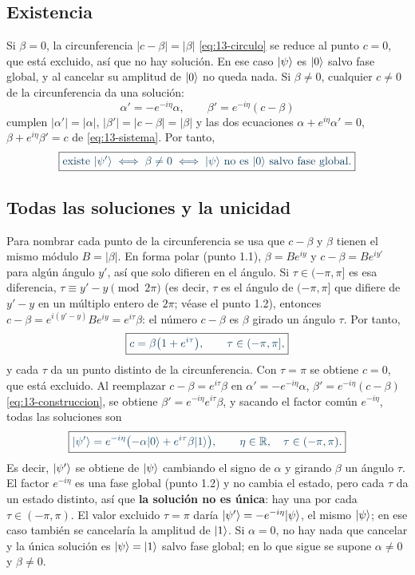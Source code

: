 \subsection*{Existencia}

Si $\beta=0$, la circunferencia $|c-\beta|=|\beta|$ \eqref{eq:13-circulo} se reduce al punto
$c=0$, que está excluido, así que no hay solución. En ese caso $\lvert \psi\rangle$ es $\lvert 0\rangle$ salvo fase
global, y al cancelar su amplitud de $\lvert 0\rangle$ no queda nada. Si $\beta\neq0$, cualquier $c\neq0$
de la circunferencia da una solución:
\begin{equation}\label{eq:13-construccion}
  \alpha'=-e^{-i\eta}\alpha,\qquad \beta'=e^{-i\eta}(c-\beta)
\end{equation}
cumplen $|\alpha'|=|\alpha|$, $|\beta'|=|c-\beta|=|\beta|$ y las dos ecuaciones
$\alpha+e^{i\eta}\alpha'=0$, $\beta+e^{i\eta}\beta'=c$ de \eqref{eq:13-sistema}. Por tanto,
\[
  \destacado{\text{existe }\ket{\psi'}\iff \beta\neq0\iff \ket\psi\text{ no es }\ket0
  \text{ salvo fase global}.}
\]

\subsection*{Todas las soluciones y la unicidad}

Para nombrar cada punto de la circunferencia se usa que $c-\beta$ y $\beta$ tienen el mismo
módulo $B=|\beta|$. En forma polar (punto 1.1), $\beta=Be^{iy}$ y $c-\beta=Be^{iy'}$ para algún
ángulo $y'$, así que solo difieren en el ángulo. Si $\tau\in(-\pi,\pi]$ es esa diferencia,
$\tau\equiv y'-y\pmod{2\pi}$ (es decir, $\tau$ es el ángulo de $(-\pi,\pi]$ que difiere de $y'-y$ en un múltiplo entero de $2\pi$; véase el punto 1.2), entonces $c-\beta=e^{i(y'-y)}Be^{iy}=e^{i\tau}\beta$: el número
$c-\beta$ es $\beta$ girado un ángulo $\tau$. Por tanto,
\begin{equation}\label{eq:13-c-tau}
  \destacado{c=\beta\bigl(1+e^{i\tau}\bigr),\qquad \tau\in(-\pi,\pi],}
\end{equation}
y cada $\tau$ da un punto distinto de la circunferencia. Con $\tau=\pi$ se obtiene $c=0$, que
está excluido. Al reemplazar $c-\beta=e^{i\tau}\beta$ en $\alpha'=-e^{-i\eta}\alpha$, $\beta'=e^{-i\eta}(c-\beta)$ \eqref{eq:13-construccion}, se obtiene $\beta'=e^{-i\eta}e^{i\tau}\beta$, y sacando el factor común $e^{-i\eta}$, todas las
soluciones son
\begin{equation}\label{eq:13-soluciones}
  \destacado{\ket{\psi'}=e^{-i\eta}\bigl(-\alpha\ket0+e^{i\tau}\beta\ket1\bigr),
  \qquad \eta\in\mathbb R,\quad \tau\in(-\pi,\pi).}
\end{equation}
Es decir, $\lvert \psi'\rangle$ se obtiene de $\lvert \psi\rangle$ cambiando el signo de $\alpha$ y girando $\beta$
un ángulo $\tau$. El factor $e^{-i\eta}$ es una fase global (punto 1.2) y no cambia el estado,
pero cada $\tau$ da un estado distinto, así que \textbf{la solución no es única}: hay una por
cada $\tau\in(-\pi,\pi)$. El valor excluido $\tau=\pi$ daría $\lvert \psi'\rangle=-e^{-i\eta}\lvert \psi\rangle$,
el mismo $\lvert \psi\rangle$; en ese caso también se cancelaría la amplitud de $\lvert 1\rangle$. Si $\alpha=0$,
no hay nada que cancelar y la única solución es $\lvert \psi\rangle=\lvert 1\rangle$ salvo fase global; en lo que
sigue se supone $\alpha\neq0$ y $\beta\neq0$.

